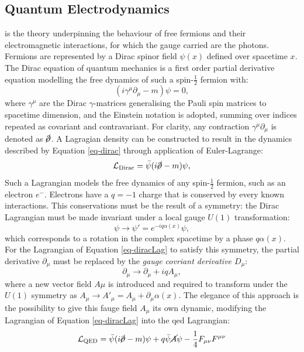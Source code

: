\subsection{Quantum Electrodynamics}\label{subsec-QED}
 is the theory underpinning the behaviour of free fermions and their electromagnetic interactions, for which the gauge carried are the photons. Fermions are represented by a Dirac spinor field $\psi(x)$ defined over spacetime $x$. The Dirac equation of quantum mechanics is a first order partial derivative equation modelling the free dynamics of such a spin-$\frac{1}{2}$ fermion with:
\begin{equation}\label{eq-dirac}
    (i\gamma^{\mu} \partial_{\mu} - m) \psi = 0,
\end{equation}
where $\gamma^{\mu}$ are the Dirac $\gamma$-matrices generalising the Pauli spin matrices to spacetime dimension, and the Einstein notation is adopted, summing over indices repeated as covariant and contravariant. For clarity, any contraction $\gamma^{\mu} \partial_{\mu}$ is denoted as $\cancel{\partial}$. A Lagragian density can be constructed to result in the dynamics described by Equation \ref{eq-dirac} through application of Euler-Lagrange:
\begin{equation}\label{eq-diracLag}
   \mathcal{L}_{\text{Dirac}} = \bar{\psi} (i \cancel{\partial}- m) \psi,
\end{equation}
Such a Lagrangian models the free dynamics of any spin-$\frac{1}{2}$ fermion, such as an electron $e^-$. Electrons have a $q = -1$ charge that is conserved by every known interactions. This conservations must be the result of a symmetry: the Dirac Lagrangian must be made invariant under a local gauge $U(1)$ transformation:
\begin{equation}\label{eq-GaugeU1}
    \psi \rightarrow \psi' = e^{-iq\alpha(x)} \psi ,
\end{equation}
which corresponds to a rotation in the complex spacetime by a phase $q\alpha(x)$. For the Lagrangian of Equation \ref{eq-diracLag} to satisfy this symmetry, the partial derivative $\partial_{\mu}$ must be replaced by the \textit{gauge covriant derivative $D_{\mu}$}:
\begin{equation}\label{eq-GaugeU1}
    \partial_{\mu} \rightarrow \partial_{\mu} + iqA_{\mu},
\end{equation}
where a new vector field $A\mu$ is introduced and required to transform under the $U(1)$ symmetry as $A_{\mu} \rightarrow A'_{\mu} = A_{\mu} + \partial_{\mu} \alpha(x)$. The elegance of this approach is the possibility to give this fauge field $A_{\mu}$ its own dynamic, modifying the Lagrangian of Equation \ref{eq-diracLag} into the \gls{qed} Lagrangian: \[ \mathcal{L}_{\text{QED}} = \bar{\psi} (i \cancel{\partial}- m) \psi + q \bar{\psi} \cancel{A} \psi - \frac{1}{4} F_{\mu\nu} F^{\mu\nu} \]
